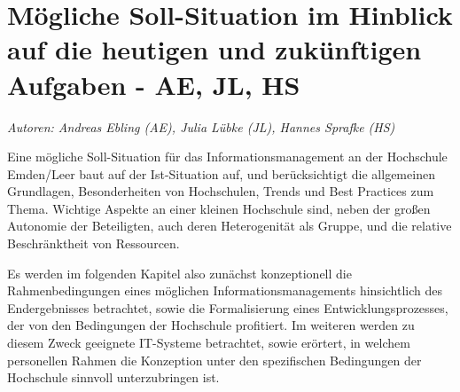 \chapter{Mögliche Soll-Situation im Hinblick auf die heutigen und zukünftigen Aufgaben - AE, JL, HS}
\label{chapter_sollsituation_INM}
\textit{Autoren: Andreas Ebling (AE), Julia Lübke (JL), Hannes Sprafke (HS)}

Eine mögliche Soll-Situation für das Informationsmanagement an der Hochschule Emden/Leer baut auf der Ist-Situation auf, und berücksichtigt die allgemeinen Grundlagen, Besonderheiten von Hochschulen, Trends und Best Practices zum Thema. Wichtige Aspekte an einer kleinen Hochschule sind, neben der großen Autonomie der Beteiligten, auch deren Heterogenität als Gruppe, und die relative Beschränktheit von Ressourcen.

Es werden im folgenden Kapitel also zunächst konzeptionell die Rahmenbedingungen eines möglichen Informationsmanagements hinsichtlich des Endergebnisses betrachtet, sowie die Formalisierung eines Entwicklungsprozesses, der von den Bedingungen der Hochschule profitiert. Im weiteren werden zu diesem Zweck geeignete IT-Systeme betrachtet, sowie erörtert, in welchem personellen Rahmen die Konzeption unter den spezifischen Bedingungen der Hochschule sinnvoll unterzubringen ist.





